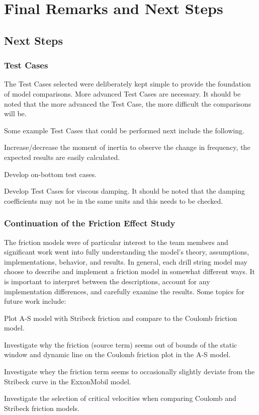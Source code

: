 \chapter{Final Remarks and Next Steps}
\section{Next Steps}
\subsection{Test Cases}
The Test Cases selected were deliberately kept simple to provide the foundation of model comparisons.  More advanced Test Cases are necessary.  It should be noted that the more advanced the Test Case, the more difficult the comparisons will be.

Some example Test Cases that could be performed next include the following.
\begin{bulletedlist}
	\item Increase/decrease the moment of inertia to observe the change in frequency, the expected results are easily calculated.
	\item Develop on-bottom test cases.
    \item Develop Test Cases for viscous damping.  It should be noted that the damping coefficients may not be in the same units and this needs to be checked.
\end{bulletedlist}

\subsection{Continuation of the Friction Effect Study}
The friction models were of particular interest to the team members and significant work went into fully understanding the model's theory, assumptions, implementations, behavior, and results.  In general, each drill string model may choose to describe and implement a friction model in somewhat different ways.  It is important to interpret between the descriptions, account for any implementation differences, and carefully examine the results.  Some topics for future work include:
\begin{bulletedlist}
	\item Plot A-S model with Stribeck friction and compare to the Coulomb friction model.
	\item Investigate why the friction (source term) seems out of bounds of the static window and dynamic line on the Coulomb friction plot in the A-S model.
	\item Investigate whey the friction term seems to occasionally slightly deviate from the Stribeck curve in the ExxonMobil model.
	\item Investigate the selection of critical velocities when comparing Coulomb and Stribeck friction models.
\end{bulletedlist}

